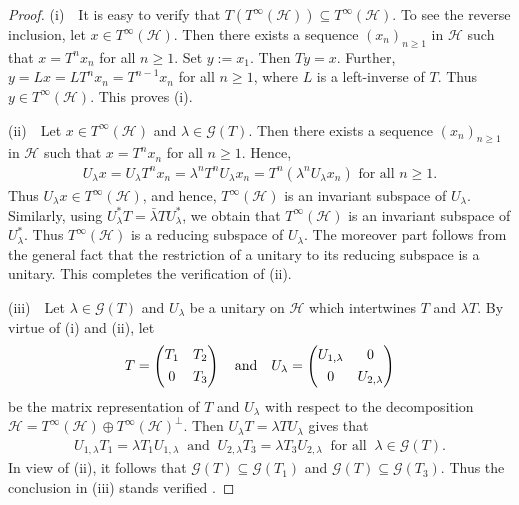 \documentclass[a4paper,oneside,10pt, reqno]{amsproc}
\theoremstyle{remark}
\theoremstyle{definition}
\newcommand{\beqn}{\begin{eqnarray*}}
\newcommand{\eeqn}{\end{eqnarray*}}
\begin{document}
\begin{proof}
(i)\ \ It is easy to verify that $T(T^\infty(\mathcal H)) \subseteq T^\infty(\mathcal H)$. To see the reverse inclusion, let $x \in T^\infty(\mathcal H)$. Then there exists a sequence $(x_n)_{n \geqslant 1}$ in $\mathcal H$ such that $x = T^n x_n$ for all $n \geqslant 1$. Set $y := x_1$. Then $Ty = x$. Further, $y = Lx = L T^n x_n = T^{n-1} x_n$ for all $n \geqslant 1$, where $L$ is a left-inverse of $T$. Thus $y \in T^\infty(\mathcal H)$. This proves (i).

(ii)\ \ Let $x \in T^\infty(\mathcal H)$ and $\lambda \in \mathcal G(T)$. Then there exists a sequence $(x_n)_{n \geqslant 1}$ in $\mathcal H$ such that $x = T^n x_n$ for all $n \geqslant 1$. Hence,
\beqn
U_\lambda x = U_\lambda T^n x_n = \lambda^n T^n U_\lambda x_n = T^n(\lambda^n U_\lambda x_n) \mbox{ for all } n \geqslant 1.
\eeqn
Thus $U_\lambda x \in T^\infty(\mathcal H)$, and hence, $T^\infty(\mathcal H)$ is an invariant subspace of $U_\lambda$. Similarly, using $U^*_\lambda T = \bar \lambda T U^*_\lambda$, we obtain that $T^\infty(\mathcal H)$ is an invariant subspace of $U^*_\lambda$. Thus $T^\infty(\mathcal H)$ is a reducing subspace of $U_\lambda$. The moreover part follows from the general fact that the restriction of a unitary to its reducing subspace is a unitary. This completes the verification of (ii).

(iii)\ \ Let $\lambda \in \mathcal G(T)$ and $U_\lambda$ be a unitary on $\mathcal H$ which intertwines $T$ and $\lambda T$. By virtue of (i) and (ii), let 
\beqn
T = \left(\begin{matrix}
T_1 & T_2\\
&\vspace{-.3cm}\\
0 & T_3 \end{matrix}\right) \quad \mbox{and} \quad  U_\lambda = \left(\begin{matrix}
U_{1,\lambda} & 0\\
&\vspace{-.3cm}\\
0 & U_{2, \lambda} \end{matrix}\right)
\eeqn
be the matrix representation of $T$ and $U_\lambda$ with respect to the decomposition $\mathcal H = T^\infty(\mathcal H) \oplus T^\infty(\mathcal H)^\bot$. Then $U_\lambda T = \lambda T U_\lambda$ gives that
\beqn
U_{1,\lambda} T_1 = \lambda T_1 U_{1, \lambda}\ \mbox{ and }\ U_{2,\lambda} T_3 = \lambda T_3 U_{2, \lambda}\ \mbox{ for all }\ \lambda \in \mathcal G(T).
\eeqn
In view of (ii), it follows that $\mathcal G(T) \subseteq \mathcal G(T_1)$ and $\mathcal G(T) \subseteq \mathcal G(T_3)$. Thus the conclusion in (iii) stands verified .


\end{proof}
\end{document}
